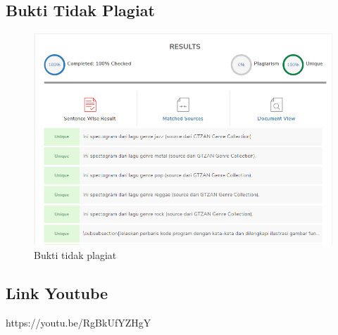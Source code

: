 \subsection{Bukti Tidak Plagiat}
\begin{figure}[H]
	\centering
	\includegraphics[width=12cm]{figures/1174083/figures6/plagiarism.png}
	\caption{Bukti tidak plagiat}
\end{figure}

\subsection{Link Youtube}
https://youtu.be/RgBkUfYZHgY
